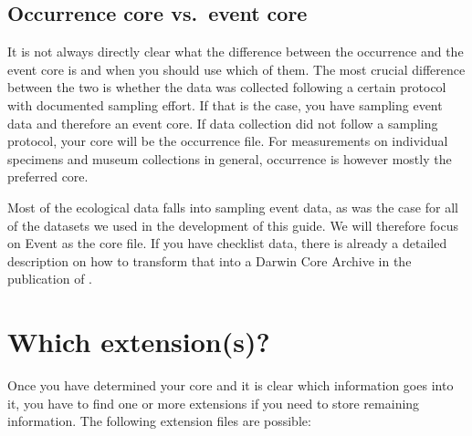 \documentclass[
  oneside]{book}
\begin{document}
\subsection{Occurrence core vs.~event core}\label{occurrence-core-vs.-event-core}

It is not always directly clear what the difference between the occurrence and the event core is and when you should use which of them. The most crucial difference between the two is whether the data was collected following a certain protocol with documented sampling effort. If that is the case, you have sampling event data and therefore an event core. If data collection did not follow a sampling protocol, your core will be the occurrence file. For measurements on individual specimens and museum collections in general, occurrence is however mostly the preferred core.

Most of the ecological data falls into sampling event data, as was the case for all of the datasets we used in the development of this guide. We will therefore focus on Event as the core file. If you have checklist data, there is already a detailed description on how to transform that into a Darwin Core Archive in the publication of \textcite{Reyershove}.

\section{Which extension(s)?}\label{which-extensions}

Once you have determined your core and it is clear which information goes into it, you have to find one or more extensions if you need to store remaining information. The following extension files are possible:
\end{document}
